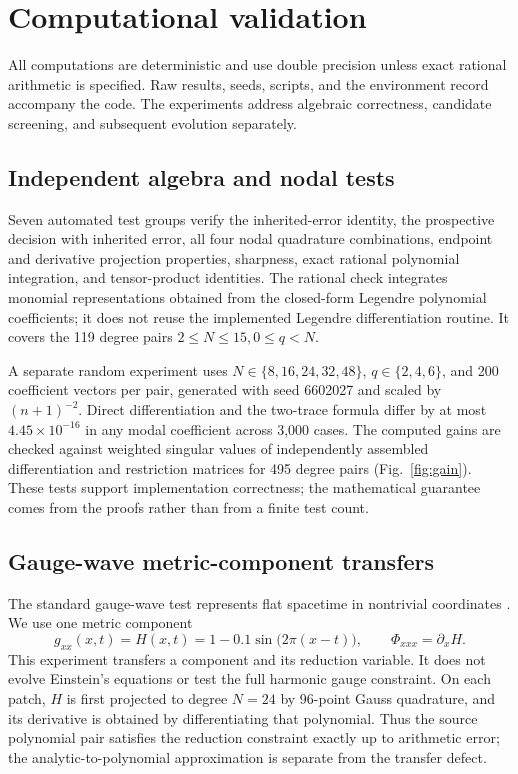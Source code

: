 \documentclass[11pt,a4paper]{article}
\theoremstyle{remark}\newtheorem{remark}[theorem]{Remark}
\begin{document}
\section{Computational validation}
\label{sec:experiments}
All computations are deterministic and use double precision unless exact
rational arithmetic is specified. Raw results, seeds, scripts, and the
environment record accompany the code. The experiments address algebraic
correctness, candidate screening, and subsequent evolution separately.

\subsection{Independent algebra and nodal tests}
Seven automated test groups verify the inherited-error identity, the
prospective decision with inherited error, all four nodal quadrature
combinations, endpoint and derivative projection properties, sharpness,
exact rational polynomial integration, and tensor-product identities.
The rational check integrates monomial representations obtained from the
closed-form Legendre polynomial coefficients; it does not reuse the
implemented Legendre differentiation routine. It covers the 119 degree pairs
\(2\le N\le15,0\le q<N\).

A separate random experiment uses \(N\in\{8,16,24,32,48\}\),
\(q\in\{2,4,6\}\), and 200 coefficient vectors per pair, generated with
seed 6602027 and scaled by \((n+1)^{-2}\). Direct differentiation and the
two-trace formula differ by at most \(4.45\times10^{-16}\) in any modal
coefficient across 3,000 cases. The computed gains are checked against
weighted singular values of independently assembled differentiation and
restriction matrices for 495 degree pairs (Fig.~\ref{fig:gain}).
These tests support implementation correctness; the mathematical guarantee
comes from the proofs rather than from a finite test count.

\subsection{Gauge-wave metric-component transfers}
The standard gauge-wave test represents flat spacetime in nontrivial
coordinates \cite{alcubierre2004}. We use one metric component
\begin{equation}
 g_{xx}(x,t)=H(x,t)=1-0.1\sin\bigl(2\pi(x-t)\bigr),
 \qquad \Phi_{xxx}=\partial_xH.
 \label{eq:gaugewave}
\end{equation}
This experiment transfers a component and its reduction variable. It does
not evolve Einstein's equations or test the full harmonic gauge constraint.
On each patch, \(H\) is first projected to degree \(N=24\) by 96-point
Gauss quadrature, and its derivative is obtained by differentiating that
polynomial. Thus the source polynomial pair satisfies the reduction
constraint exactly up to arithmetic error; the analytic-to-polynomial
approximation is separate from the transfer defect.
\end{document}
